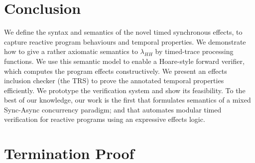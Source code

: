 \documentclass[acmsmall,review,anonymous]{acmart}\settopmatter{printfolios=true,printccs=false,printacmref=false}
\newcommand{\code}[1]{{\tt{\ensuremath{\m{#1}}}}}
\newcommand{\m}{\mathit}
\begin{document}
%
%


\section{Conclusion}
\label{sec:conclusion}
We define the syntax and semantics of the novel timed synchronous effects, to capture reactive program behaviours and  temporal properties. We demonstrate how to give a rather axiomatic semantics to \code{\lambda_{HH}} by timed-trace processing functions. We use this semantic model to enable  a Hoare-style forward verifier,  which computes the program effects constructively.
We present an effects inclusion checker (the TRS) to prove the annotated temporal properties efficiently. We prototype the verification system and show its feasibility.
To the best of our knowledge, our work is the first that formulates semantics of a mixed Sync-Async concurrency paradigm; and that automates modular timed verification for reactive programs using an expressive effects logic. 










\appendix

\section{Termination Proof}  \label{proof:TerminationProof}
\end{document}
